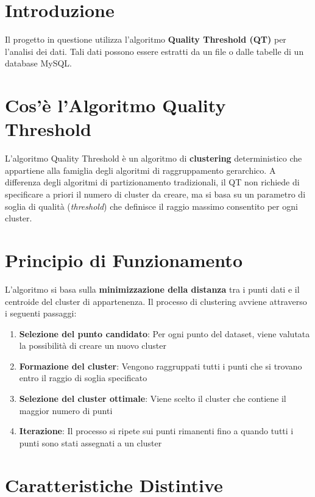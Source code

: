 \section{Introduzione}


Il progetto in questione utilizza l'algoritmo \textbf{Quality Threshold (QT)} per l'analisi dei dati. Tali dati possono essere estratti da un file o dalle tabelle di un database MySQL.

\section{Cos'è l'Algoritmo Quality Threshold}

L'algoritmo Quality Threshold è un algoritmo di \textbf{clustering} deterministico che appartiene alla famiglia degli algoritmi di raggruppamento gerarchico. A differenza degli algoritmi di partizionamento tradizionali, il QT non richiede di specificare a priori il numero di cluster da creare, ma si basa su un parametro di soglia di qualità (\textit{threshold}) che definisce il raggio massimo consentito per ogni cluster.

\section{Principio di Funzionamento}

L'algoritmo si basa sulla \textbf{minimizzazione della distanza} tra i punti dati e il centroide del cluster di appartenenza. Il processo di clustering avviene attraverso i seguenti passaggi:

\begin{enumerate}
\item \textbf{Selezione del punto candidato}: Per ogni punto del dataset, viene valutata la possibilità di creare un nuovo cluster
\item \textbf{Formazione del cluster}: Vengono raggruppati tutti i punti che si trovano entro il raggio di soglia specificato
\item \textbf{Selezione del cluster ottimale}: Viene scelto il cluster che contiene il maggior numero di punti
\item \textbf{Iterazione}: Il processo si ripete sui punti rimanenti fino a quando tutti i punti sono stati assegnati a un cluster
\end{enumerate}

\section{Caratteristiche Distintive}

